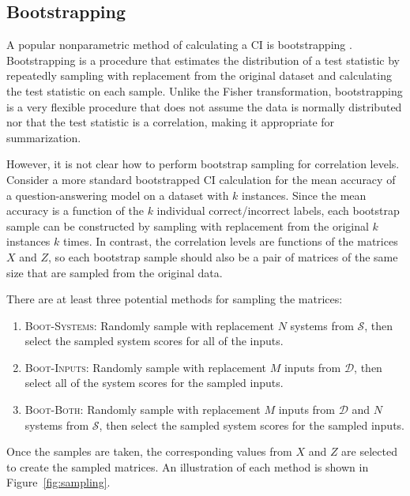\subsection{Bootstrapping}
\label{sec:ci_bootstrapping}
A popular nonparametric method of calculating a CI is bootstrapping \citep{EfronTi93}.
Bootstrapping is a procedure that estimates the distribution of a test statistic by repeatedly sampling with replacement from the original dataset and calculating the test statistic on each sample.
Unlike the Fisher transformation, bootstrapping is a very flexible procedure that does not assume the data is normally distributed nor that the test statistic is a correlation, making it appropriate for summarization.

However, it is not clear how to perform bootstrap sampling for correlation levels.
Consider a more standard bootstrapped CI calculation for the mean accuracy of a question-answering model on a dataset with $k$ instances.
Since the mean accuracy is a function of the $k$ individual correct/incorrect labels, each bootstrap sample can be constructed by sampling with replacement from the original $k$ instances $k$ times.
In contrast, the correlation levels are functions of the matrices $X$ and $Z$, so each bootstrap sample should also be a pair of matrices of the same size that are sampled from the original data.

There are at least three potential methods for sampling the matrices:
\begin{enumerate}
    \item \textsc{Boot-Systems:} Randomly sample with replacement $N$ systems from $\mathcal{S}$, then select the sampled system scores for all of the inputs.

    \item \textsc{Boot-Inputs:} Randomly sample with replacement $M$ inputs from $\mathcal{D}$, then select all of the system scores for the sampled inputs.
    
    \item \textsc{Boot-Both:} Randomly sample with replacement $M$ inputs from $\mathcal{D}$ and $N$ systems from $\mathcal{S}$, then select the sampled system scores for the sampled inputs.
\end{enumerate}
Once the samples are taken, the corresponding values from $X$ and $Z$ are selected to create the sampled matrices.
An illustration of each method is shown in Figure~\ref{fig:sampling}.



